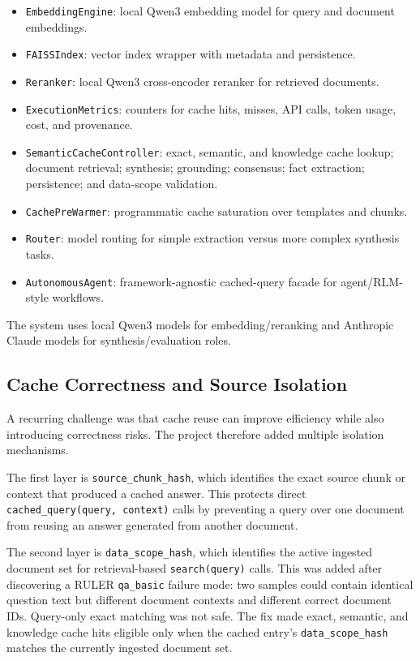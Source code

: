 \documentclass[10pt,a4paper]{article}
\begin{document}
\begin{itemize}
\item \texttt{EmbeddingEngine}: local Qwen3 embedding model for query and document embeddings.
\item \texttt{FAISSIndex}: vector index wrapper with metadata and persistence.
\item \texttt{Reranker}: local Qwen3 cross-encoder reranker for retrieved documents.
\item \texttt{ExecutionMetrics}: counters for cache hits, misses, API calls, token usage, cost, and provenance.
\item \texttt{SemanticCacheController}: exact, semantic, and knowledge cache lookup; document retrieval; synthesis; grounding; consensus; fact extraction; persistence; and data-scope validation.
\item \texttt{CachePreWarmer}: programmatic cache saturation over templates and chunks.
\item \texttt{Router}: model routing for simple extraction versus more complex synthesis tasks.
\item \texttt{AutonomousAgent}: framework-agnostic cached-query facade for agent/RLM-style workflows.
\end{itemize}

The system uses local Qwen3 models for embedding/reranking and Anthropic Claude models for synthesis/evaluation roles.

\subsection{Cache Correctness and Source Isolation}

A recurring challenge was that cache reuse can improve efficiency while also introducing correctness risks. The project therefore added multiple isolation mechanisms.

The first layer is \texttt{source\_chunk\_hash}, which identifies the exact source chunk or context that produced a cached answer. This protects direct \texttt{cached\_query(query, context)} calls by preventing a query over one document from reusing an answer generated from another document.

The second layer is \texttt{data\_scope\_hash}, which identifies the active ingested document set for retrieval-based \texttt{search(query)} calls. This was added after discovering a RULER \texttt{qa\_basic} failure mode: two samples could contain identical question text but different document contexts and different correct document IDs. Query-only exact matching was not safe. The fix made exact, semantic, and knowledge cache hits eligible only when the cached entry's \texttt{data\_scope\_hash} matches the currently ingested document set.
\end{document}
